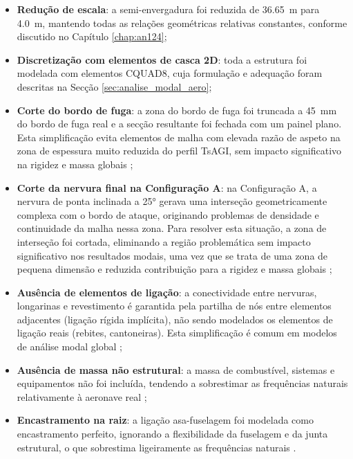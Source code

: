 \documentclass[11pt,oneside,a4paper,final]{report}
\begin{document}
\begin{itemize}
    \item \textbf{Redução de escala}: a semi-envergadura foi reduzida de \SI{36.65}{\meter} para \SI{4.0}{\meter}, mantendo todas as relações geométricas relativas constantes, conforme discutido no Capítulo \ref{chap:an124};

    \item \textbf{Discretização com elementos de casca 2D}: toda a estrutura foi modelada com elementos CQUAD8, cuja formulação e adequação foram descritas na Secção \ref{sec:analise_modal_aero};

    \item \textbf{Corte do bordo de fuga}: a zona do bordo de fuga foi truncada a \SI{45}{\milli\meter} do bordo de fuga real e a secção resultante foi fechada com um painel plano. Esta simplificação evita elementos de malha com elevada razão de aspeto na zona de espessura muito reduzida do perfil TsAGI, sem impacto significativo na rigidez e massa globais \cite{Bathe2014};
    
    \item \textbf{Corte da nervura final na Configuração A}: na Configuração A, a nervura de ponta inclinada a 25° gerava uma interseção geometricamente complexa com o bordo de ataque, originando problemas de densidade e continuidade da malha nessa zona. Para resolver esta situação, a zona de interseção foi cortada, eliminando a região problemática sem impacto significativo nos resultados modais, uma vez que se trata de uma zona de pequena dimensão e reduzida contribuição para a rigidez e massa globais \cite{Bathe2014};

    \item \textbf{Ausência de elementos de ligação}: a conectividade entre nervuras, longarinas e revestimento é garantida pela partilha de nós entre elementos adjacentes (ligação rígida implícita), não sendo modelados os elementos de ligação reais (rebites, cantoneiras). Esta simplificação é comum em modelos de análise modal global \cite{Wright2015};

    \item \textbf{Ausência de massa não estrutural}: a massa de combustível, sistemas e equipamentos não foi incluída, tendendo a sobrestimar as frequências naturais relativamente à aeronave real \cite{Craig2006};

    \item \textbf{Encastramento na raiz}: a ligação asa-fuselagem foi modelada como encastramento perfeito, ignorando a flexibilidade da fuselagem e da junta estrutural, o que sobrestima ligeiramente as frequências naturais \cite{Hodges2011}.
\end{itemize}
\end{document}
